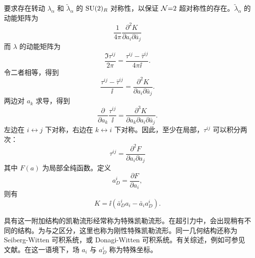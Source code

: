 要求存在转动 $\lambda_\alpha$ 和 $\tilde\lambda_\alpha$ 的 $\mathop{\mathrm{SU}}(2)_R$ 对称性，以保证 $\mathcal{N}{=}2$ 超对称性的存在。$\tilde\lambda_\alpha$ 的动能矩阵为
\begin{equation}
\frac{1}{4\pi}\frac{\partial^2 K}{\partial a_i \partial\bar a_j}
\end{equation}
而 $\lambda$ 的动能矩阵为
\begin{equation}
\frac{\Im \tau^{ij}}{2\pi}=\frac{\tau^{ij}-\bar \tau^{ij}}{4\pi \ii}.
\end{equation}
令二者相等，得到
\begin{equation}
\frac{\tau^{ij}-\bar \tau^{ij}}\ii =\frac{\partial^2 K}{\partial a_i \partial\bar a_j}.
\end{equation}
两边对 $a_k$ 求导，得到
\begin{equation}
\frac{\partial}{\partial a_k} \frac{\tau^{ij}}\ii=\frac{\partial^3 K}{\partial a_k\partial a_i \partial\bar a_j}.
\end{equation}
左边在 $i\leftrightarrow j$ 下对称，右边在 $k\leftrightarrow i$ 下对称。因此，至少在局部，$\tau^{ij}$ 可以积分两次：
\begin{equation}
\tau^{ij}=\frac{\partial^2 F}{\partial a_i\partial a_j}\label{pretau}
\end{equation}
其中 $F(a)$ 为局部全纯函数。定义
\begin{equation}
a_D^i=\frac{\partial F}{\partial a_i},\label{adi}
\end{equation}
则有
\begin{equation}
K=\ii(\bar a_D^i a_i-\bar a_i a_D^i ).\label{Keq}
\end{equation}

具有这一附加结构的凯勒流形经常称为特殊凯勒流形。在超引力中，会出现稍有不同的结构。为与之区分，这里也称为刚性特殊凯勒流形。同一几何结构还称为 Seiberg-Witten 可积系统，或 Donagi-Witten 可积系统。有关综述，例如可参见文献\cite{Donagi:1997sr,Craps:1997gp,Freed:1997dp}。在这一语境下，场 $a_i$ 与 $a_D^i$ 称为特殊坐标。

